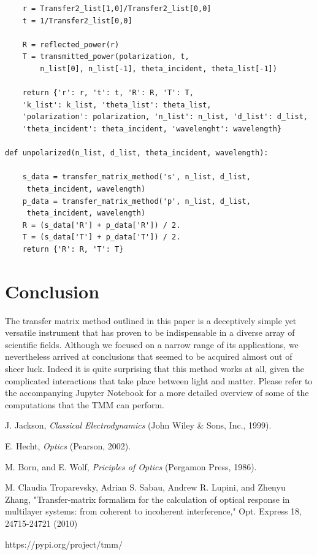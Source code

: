 \documentclass[preprint, onecolumn, amsmath, amssymb, aps]{revtex4-1}
\numberwithin{equation}{section}
\begin{document}
\begin{lstlisting}
	r = Transfer2_list[1,0]/Transfer2_list[0,0]
	t = 1/Transfer2_list[0,0]

	R = reflected_power(r)
	T = transmitted_power(polarization, t,
		n_list[0], n_list[-1], theta_incident, theta_list[-1])

	return {'r': r, 't': t, 'R': R, 'T': T,
	'k_list': k_list, 'theta_list': theta_list,
	'polarization': polarization, 'n_list': n_list, 'd_list': d_list, 
	'theta_incident': theta_incident, 'wavelenght': wavelength}

def unpolarized(n_list, d_list, theta_incident, wavelength):

	s_data = transfer_matrix_method('s', n_list, d_list,
	 theta_incident, wavelength)
	p_data = transfer_matrix_method('p', n_list, d_list,
	 theta_incident, wavelength)
	R = (s_data['R'] + p_data['R']) / 2.
	T = (s_data['T'] + p_data['T']) / 2.
	return {'R': R, 'T': T}
\end{lstlisting}

\newpage

\section{Conclusion}

The transfer matrix method outlined in this paper is a deceptively simple yet versatile instrument that has proven to be indispensable in a diverse array of scientific fields. Although we focused on a narrow range of its applications, we nevertheless arrived at conclusions that seemed to be acquired almost out of sheer luck. Indeed it is quite surprising that this method works at all, given the complicated interactions that take place between light and matter. Please refer to the accompanying Jupyter Notebook for a more detailed overview of some of the computations that the TMM can perform.  

\begin{thebibliography}{1}
	
 J. Jackson, \textit{Classical Electrodynamics} (John Wiley \& Sons, Inc., 1999).
	
 E. Hecht, \textit{Optics} (Pearson, 2002).
	
 M. Born, and E. Wolf, \textit{Priciples of Optics} (Pergamon Press, 1986).
	
 M. Claudia Troparevsky, Adrian S. Sabau, Andrew R. Lupini, and Zhenyu Zhang, "Transfer-matrix formalism for the calculation of optical response in multilayer systems: from coherent to incoherent interference," Opt. Express 18, 24715-24721 (2010)

 https://pypi.org/project/tmm/

\end{thebibliography}
\end{document}
